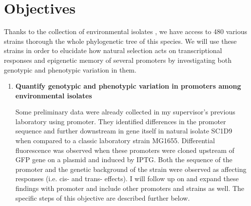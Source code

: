 \chapter*{Objectives}

\shorthandoff{-} 

Thanks to the collection of environmental  isolates \cite{ishii2006presence}, we have access to 480 various strains thorough the whole phylogenetic tree of this species.
We will use these strains in order to elucidate how natural selection acts on transcriptional responses and epigenetic memory of several promoters by investigating both genotypic and phenotypic variation in them.

\begin{enumerate}

	\item \textbf{Quantify genotypic and phenotypic variation in promoters among environmental  isolates}
	
	Some preliminary data were already collected in my supervisor's previous laboratory using  promoter.
	They identified differences in the promoter sequence and further downstream in  gene itself in natural isolate SC1\textunderscore D9 when compared to a classic laboratory strain MG1655.
	Differential fluorescence was observed when these promoters were cloned upstream of GFP gene on a plasmid and induced by IPTG.
	Both the sequence of the promoter and the genetic background of the strain were observed as affecting responses (i.e. cis- and trans- effects).
	I will follow up on and expand these findings with  promoter and include other promoters and strains as well.
	The specific steps of this objective are described further below.


\end{enumerate}
